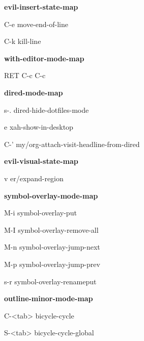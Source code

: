 \documentclass[10pt]{article}
\renewcommand\subsection[1]{\smallskip\par\textbf{\color{heading}#1}}
\begin{document}
\begin{multicols}{4}
  \subsection{evil-insert-state-map}
  \begin{keylist}
    \item[C-e] move-end-of-line
    \item[C-k] kill-line
  \end{keylist}
  \subsection{with-editor-mode-map}
  \begin{keylist}
    \item[RET] C-c C-c
  \end{keylist}

  \subsection{dired-mode-map}
  \begin{keylist}
    \item[s-.] dired-hide-dotfiles-mode
    \item[e] xah-show-in-desktop
    \item[C-'] my/org-attach-visit-headline-from-dired
    \end{keylist}

  \subsection{evil-visual-state-map}
  \begin{keylist}
    \item[v] er/expand-region
  \end{keylist}
  \subsection{symbol-overlay-mode-map}
  \begin{keylist}
    \item[M-i] symbol-overlay-put
    \item[M-I] symbol-overlay-remove-all
    \item[M-n] symbol-overlay-jump-next
    \item[M-p] symbol-overlay-jump-prev
    \item[s-r] symbol-overlay-renameput
  \end{keylist}

  \subsection{outline-minor-mode-map}
  \begin{keylist}
    \item[C-<tab>] bicycle-cycle
    \item[S-<tab>] bicycle-cycle-global
  \end{keylist}


\end{multicols}
\end{document}
